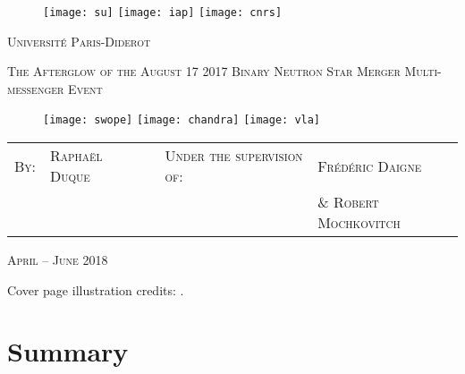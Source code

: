 
\begin{figure}[!htb]
  \texttt{[image: su]}
\endminipage\hfill
{}
  \texttt{[image: iap]}
\endminipage\hfill
{}%
  \texttt{[image: cnrs]}
\endminipage
\end{figure}

\begin{center}

{\LARGE \textsc{Université Paris-Diderot}}

\vspace{1cm}

{\LARGE \textsc{The Afterglow of the August 17 2017 Binary Neutron Star Merger Multi-messenger Event}}

\vspace{1cm}

\begin{figure}[!htb]
  \texttt{[image: swope]}
\endminipage\hfill
{}
  \texttt{[image: chandra]}
\endminipage\hfill
{}%
  \texttt{[image: vla]}
\endminipage
\end{figure}
\vspace{2cm}

\begin{tabular}{p{0.7cm}p{3cm}p{3cm}p{5cm}p{5cm}}
\textsc{By:} & \textsc{Raphaël Duque} & & \textsc{Under the supervision of:} & \textsc{Frédéric Daigne} \\
             &                        & &                                   & \& \textsc{Robert Mochkovitch}
\end{tabular}
\vfill

\textsc{April -- June 2018}
\end{center}

\newpage

\quad
\vfill

Cover page illustration credits: \citep[][Fig. 2]{51}.

\newpage

\section*{Summary}

